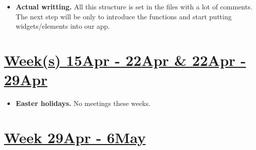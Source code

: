 \documentclass{article}
\begin{document}
\begin{itemize}
	\item \textbf{Actual writting.} All this structure is set in the files with a lot of comments. The next step will be only to introduce the functions and start putting widgets/elements into our app.

\end{itemize}
\section*{\underline{Week(s) 15Apr - 22Apr \& 22Apr - 29Apr}}
\begin{itemize}
	\item \textbf{Easter holidays.} No meetings these weeks.
\end{itemize}
\section*{\underline{Week 29Apr - 6May}}
\end{document}

